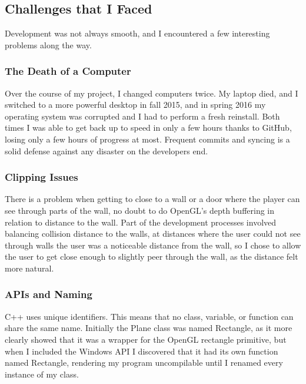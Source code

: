 \documentclass{article}
\begin{document}
\subsection{Challenges that I Faced} \label{subsec:challenges}

Development was not always smooth, and I encountered a few interesting problems along the way.

\subsubsection{The Death of a Computer} \label{subsubsec:death}

Over the course of my project, I changed computers twice. My laptop died, and I switched to a more powerful desktop in fall 2015, and in spring 2016 my operating system was corrupted and I had to perform a fresh reinstall. Both times I was able to get back up to speed in only a few hours thanks to GitHub, losing only a few hours of progress at most. Frequent commits and syncing is a solid defense against any disaster on the developers end.

\subsubsection{Clipping Issues} \label{subsubsec:clipping}

There is a problem when getting to close to a wall or a door where the player can see through parts of the wall, no doubt to do OpenGL's depth buffering in relation to distance to the wall. Part of the development processes involved balancing collision distance to the walls, at distances where the user could not see through walls the user was a noticeable distance from the wall, so I chose to allow the user to get close enough to slightly peer through the wall, as the distance felt more natural.

\subsubsection{APIs and Naming} \label{subsubsec:naming}

C++ uses unique identifiers. This means that no class, variable, or function can share the same name. Initially the Plane class was named Rectangle, as it more clearly showed that it was a wrapper for the OpenGL rectangle primitive, but when I included the Windows API I discovered that it had its own function named Rectangle, rendering my program uncompilable until I renamed every instance of my class.
\end{document}
